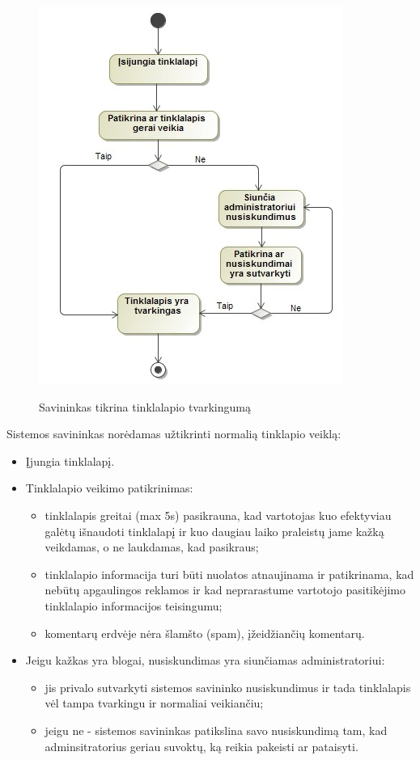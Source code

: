 \documentclass{VUMIFPSkursinis}
\begin{document}
\begin{figure}[H]
    \centering
    \includegraphics[scale=0.7]{img/geri/sistemosSav}
    \label{img:uml13}
	\caption{Savininkas tikrina tinklalapio tvarkingumą}
\end{figure}

Sistemos savininkas norėdamas užtikrinti normalią tinklapio veiklą:
\begin{itemize}
\item Įjungia tinklalapį.
\item Tinklalapio veikimo patikrinimas: 
\begin{itemize}
\item tinklalapis greitai (max 5s) pasikrauna, kad vartotojas kuo efektyviau galėtų išnaudoti tinklalapį ir kuo daugiau laiko praleistų jame kažką veikdamas, o ne laukdamas, kad pasikraus;
\item tinklalapio informacija turi būti nuolatos atnaujinama ir patikrinama, kad nebūtų apgaulingos reklamos ir kad neprarastume vartotojo pasitikėjimo tinklalapio informacijos teisingumu;
\item komentarų erdvėje nėra šlamšto (spam), įžeidžiančių komentarų.
\end{itemize}
\item Jeigu kažkas yra blogai, nusiskundimas yra siunčiamas administratoriui: 
\begin{itemize}
\item jis privalo sutvarkyti sistemos savininko nusiskundimus ir tada tinklalapis vėl tampa tvarkingu ir normaliai veikiančiu;
\item jeigu ne - sistemos savininkas patikslina savo nusiskundimą tam, kad adminsitratorius geriau suvoktų, ką reikia pakeisti ar pataisyti.
\end{itemize}
\end{itemize}
\end{document}
